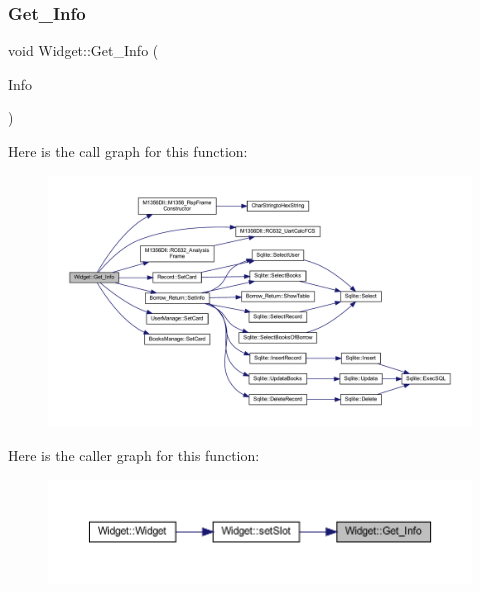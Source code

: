 \subsubsection{\texorpdfstring{Get\_Info}{Get\_Info}}
{\footnotesize\ttfamily void Widget\+::\+Get\+\_\+\+Info (\begin{DoxyParamCaption}\item[{Q\+Byte\+Array}]{Info }\end{DoxyParamCaption})\hspace{0.3cm}{\ttfamily [slot]}}

Here is the call graph for this function\+:
\nopagebreak
\begin{figure}[H]
\begin{center}
\leavevmode
\includegraphics[width=350pt]{class_widget_a0b1204d50863ef19c6ed3e39ab455d25_cgraph}
\end{center}
\end{figure}
Here is the caller graph for this function\+:
\nopagebreak
\begin{figure}[H]
\begin{center}
\leavevmode
\includegraphics[width=350pt]{class_widget_a0b1204d50863ef19c6ed3e39ab455d25_icgraph}
\end{center}
\end{figure}
\mbox{\label{class_widget_a349b456bf6a673058ef7449e44866e90}} 
